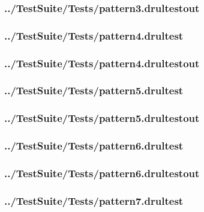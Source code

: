 \begin{changemargin}{-1in}{-1in}
\subsubsection{../TestSuite/Tests/pattern3.drultestout}


\subsubsection{../TestSuite/Tests/pattern4.drultest}


\subsubsection{../TestSuite/Tests/pattern4.drultestout}


\subsubsection{../TestSuite/Tests/pattern5.drultest}


\subsubsection{../TestSuite/Tests/pattern5.drultestout}


\subsubsection{../TestSuite/Tests/pattern6.drultest}


\subsubsection{../TestSuite/Tests/pattern6.drultestout}


\subsubsection{../TestSuite/Tests/pattern7.drultest}



\end{changemargin}
